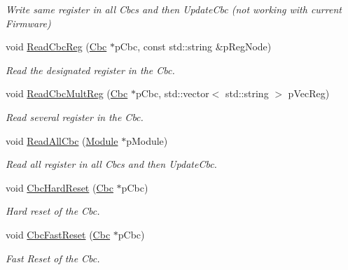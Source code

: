 \begin{DoxyCompactItemize}
\begin{DoxyCompactList}\small\item\em Write same register in all Cbcs and then Update\-Cbc (not working with current Firmware) \end{DoxyCompactList}\item 
void \hyperlink{class_ph2___hw_interface_1_1_cbc_interface_aa879b96566ef29a56b606f6cb65c8656}{Read\-Cbc\-Reg} (\hyperlink{class_ph2___hw_description_1_1_cbc}{Cbc} $\ast$p\-Cbc, const std\-::string \&p\-Reg\-Node)
\begin{DoxyCompactList}\small\item\em Read the designated register in the Cbc. \end{DoxyCompactList}\item 
void \hyperlink{class_ph2___hw_interface_1_1_cbc_interface_a74baf6bc4fb08739c1477de0b75de9c9}{Read\-Cbc\-Mult\-Reg} (\hyperlink{class_ph2___hw_description_1_1_cbc}{Cbc} $\ast$p\-Cbc, std\-::vector$<$ std\-::string $>$ p\-Vec\-Reg)
\begin{DoxyCompactList}\small\item\em Read several register in the Cbc. \end{DoxyCompactList}\item 
void \hyperlink{class_ph2___hw_interface_1_1_cbc_interface_a5a2e404039cef52b294cacfa7e667f49}{Read\-All\-Cbc} (\hyperlink{class_ph2___hw_description_1_1_module}{Module} $\ast$p\-Module)
\begin{DoxyCompactList}\small\item\em Read all register in all Cbcs and then Update\-Cbc. \end{DoxyCompactList}\item 
void \hyperlink{class_ph2___hw_interface_1_1_cbc_interface_a0e9a7f5c0a444cb8ca14f3a90cd9e759}{Cbc\-Hard\-Reset} (\hyperlink{class_ph2___hw_description_1_1_cbc}{Cbc} $\ast$p\-Cbc)
\begin{DoxyCompactList}\small\item\em Hard reset of the Cbc. \end{DoxyCompactList}\item 
void \hyperlink{class_ph2___hw_interface_1_1_cbc_interface_ae2166f5bd24481d88bdd015d1db08051}{Cbc\-Fast\-Reset} (\hyperlink{class_ph2___hw_description_1_1_cbc}{Cbc} $\ast$p\-Cbc)
\begin{DoxyCompactList}\small\item\em Fast Reset of the Cbc. \end{DoxyCompactList}\item 

\end{DoxyCompactItemize}

